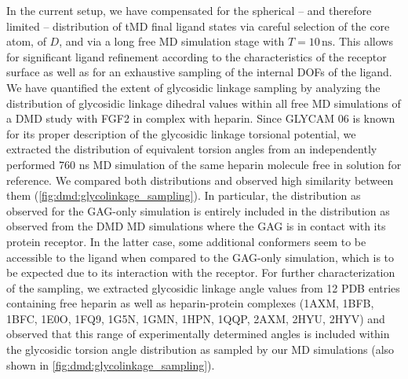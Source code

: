In the current setup, we have compensated for the spherical – and therefore
limited – distribution of tMD final ligand states via careful selection of the
core atom, of $D$, and via a long free MD simulation stage with
$T=10\,\mathrm{ns}$. This allows for significant ligand refinement according to
the characteristics of the receptor surface as well as for an exhaustive
sampling of the internal DOFs of the ligand. We have quantified the extent of
glycosidic linkage sampling by analyzing the distribution of glycosidic linkage
dihedral values within all free MD simulations of a DMD study with FGF2 in
complex with heparin. Since GLYCAM 06 is known for its proper description of the
glycosidic linkage torsional potential{\cite{kirschner_glycam06:_2008}}, we
extracted the distribution of equivalent torsion angles from an independently
performed 760 ns MD simulation of the same heparin molecule free in solution for
reference. We compared both distributions and observed high similarity between
them (\cref{fig:dmd:glycolinkage_sampling}). In particular, the distribution as
observed for the GAG-only simulation is entirely included in the distribution as
observed from the DMD MD simulations where the GAG is in contact with its
protein receptor. In the latter case, some additional conformers seem to be
accessible to the ligand when compared to the GAG-only simulation, which is to
be expected due to its interaction with the receptor. For further
characterization of the sampling, we extracted glycosidic linkage angle values
from 12 PDB entries containing free heparin as well as heparin-protein complexes
(1AXM, 1BFB, 1BFC, 1E0O, 1FQ9, 1G5N, 1GMN, 1HPN, 1QQP, 2AXM, 2HYU, 2HYV) and
observed that this range of experimentally determined angles is included within
the glycosidic torsion angle distribution as sampled by our MD simulations (also
shown in \cref{fig:dmd:glycolinkage_sampling}).


